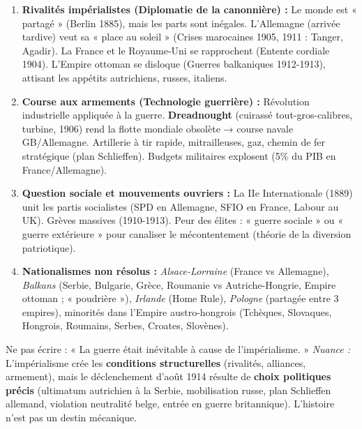 \documentclass[11pt]{article}
\begin{document}
\begin{aretenir}
\begin{enumerate}
    \item \textbf{Rivalités impérialistes (Diplomatie de la canonnière) :} Le monde est « partagé » (Berlin 1885), mais les parts sont inégales. L'Allemagne (arrivée tardive) veut sa « place au soleil » (Crises marocaines 1905, 1911 : Tanger, Agadir). La France et le Royaume-Uni se rapprochent (Entente cordiale 1904). L'Empire ottoman se disloque (Guerres balkaniques 1912-1913), attisant les appétits autrichiens, russes, italiens.
    \item \textbf{Course aux armements (Technologie guerrière) :} Révolution industrielle appliquée à la guerre. \textbf{Dreadnought} (cuirassé tout-gros-calibres, turbine, 1906) rend la flotte mondiale obsolète → course navale GB/Allemagne. Artillerie à tir rapide, mitrailleuses, gaz, chemin de fer stratégique (plan Schlieffen). Budgets militaires explosent (5\% du PIB en France/Allemagne).
    \item \textbf{Question sociale et mouvements ouvriers :} La IIe Internationale (1889) unit les partis socialistes (SPD en Allemagne, SFIO en France, Labour au UK). Grèves massives (1910-1913). Peur des élites : « guerre sociale » ou « guerre extérieure » pour canaliser le mécontentement (théorie de la diversion patriotique).
    \item \textbf{Nationalismes non résolus :} \emph{Alsace-Lorraine} (France vs Allemagne), \emph{Balkans} (Serbie, Bulgarie, Grèce, Roumanie vs Autriche-Hongrie, Empire ottoman ; « poudrière »), \emph{Irlande} (Home Rule), \emph{Pologne} (partagée entre 3 empires), minorités dans l'Empire austro-hongrois (Tchèques, Slovaques, Hongrois, Roumains, Serbes, Croates, Slovènes).
\end{enumerate}
\end{aretenir}

\begin{attention}
Ne pas écrire : « La guerre était inévitable à cause de l'impérialisme. »
\emph{Nuance :} L'impérialisme crée les \textbf{conditions structurelles} (rivalités, alliances, armement), mais le déclenchement d'août 1914 résulte de \textbf{choix politiques précis} (ultimatum autrichien à la Serbie, mobilisation russe, plan Schlieffen allemand, violation neutralité belge, entrée en guerre britannique). L'histoire n'est pas un destin mécanique.
\end{attention}
\end{document}
